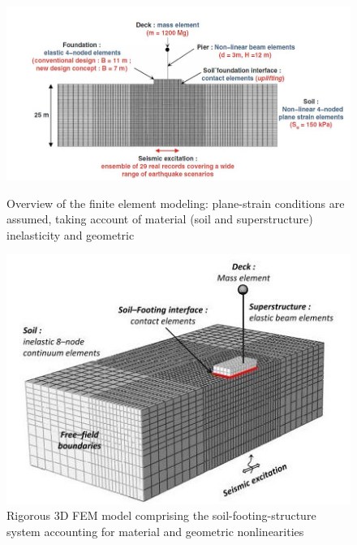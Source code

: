 \documentclass[12pt,a4paper]{report}
\begin{document}
\begin{figure}[!h]
	\centering
	\begin{minipage}[b]{0.45\textwidth}
		\includegraphics[width=\textwidth]{scheme2D}
		\caption{Overview of the finite element modeling: plane-strain conditions are assumed, taking account of material (soil and superstructure) inelasticity and geometric}
		\label{2d}
	\end{minipage}
	\hfill
	\begin{minipage}[b]{0.45\textwidth}
		\includegraphics[width=\textwidth]{3d_model}
		\caption{Rigorous 3D FEM model comprising the soil-footing-structure system accounting for material and geometric nonlinearities}
		\label{3d}
	\end{minipage}
\end{figure} 

\newpage
\end{document}
